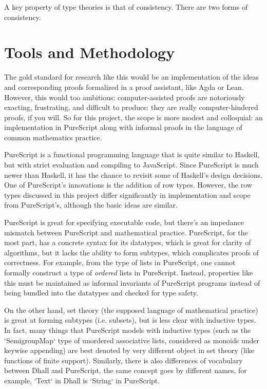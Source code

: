 \documentclass[11pt, twoside, reqno]{book}
\begin{document}
A key property of type theories is that of consistency.
There are two forms of consistency.


\section{Tools and Methodology}
\label{methods}

The gold standard for research like this would be an implementation of the ideas and corresponding proofs formalized in a proof assistant, like Agda or Lean.
However, this would too ambitious: computer-assisted proofs are notoriously exacting, frustrating, and difficult to produce: they are really computer-hindered proofs, if you will.
So for this project, the scope is more modest and colloquial: an implementation in PureScript along with informal proofs in the language of common mathematics practice.

PureScript is a functional programming language that is quite similar to Haskell, but with strict evaluation and compiling to JavaScript.
Since PureScript is much newer than Haskell, it has the chance to revisit some of Haskell's design decisions.
One of PureScript's innovations is the addition of row types.
However, the row types discussed in this project differ significantly in implementation and scope from PureScript's, although the basic ideas are similar.

PureScript is great for specifying executable code, but there's an impedance mismatch between PureScript and mathematical practice.
PureScript, for the most part, has a concrete syntax for its datatypes, which is great for clarity of algorithms, but it lacks the ability to form subtypes, which complicates proofs of correctness.
For example, from the type of lists in PureScript, one cannot formally construct a type of \emph{ordered} lists in PureScript.
Instead, properties like this must be maintained as informal invariants of PureScript programs instead of being bundled into the datatypes and checked for type safety.

On the other hand, set theory (the supposed language of mathematical practice) is great at forming subtypes (i.e. subsets), but is less clear with inductive types.
In fact, many things that PureScript models with inductive types (such as the \inHS`SemigroupMap` type of unordered associative lists, considered as monoids under keywise appending) are best denoted by very different object in set theory (like functions of finite support).
Similarly, there is also differences of vocabulary between Dhall and PureScript, the same concept goes by different names, for example, \inHS`Text` in Dhall is \inHS`String` in PureScript.
\end{document}
